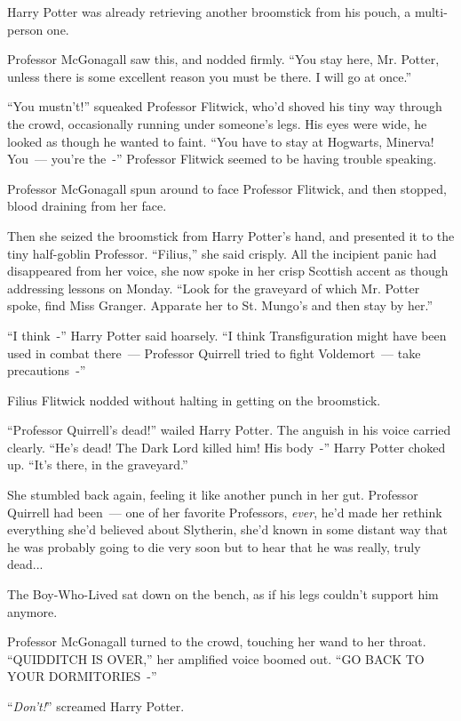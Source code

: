 Harry Potter was already retrieving another broomstick from his pouch, a multi-person one.

Professor McGonagall saw this, and nodded firmly. ``You stay here, Mr. Potter, unless there is some excellent reason you must be there. I will go at once.''

``You mustn't!'' squeaked Professor Flitwick, who'd shoved his tiny way through the crowd, occasionally running under someone's legs. His eyes were wide, he looked as though he wanted to faint. ``You have to stay at Hogwarts, Minerva! You~--- you're the~-'' Professor Flitwick seemed to be having trouble speaking.

Professor McGonagall spun around to face Professor Flitwick, and then stopped, blood draining from her face.

Then she seized the broomstick from Harry Potter's hand, and presented it to the tiny half-goblin Professor. ``Filius,'' she said crisply. All the incipient panic had disappeared from her voice, she now spoke in her crisp Scottish accent as though addressing lessons on Monday. ``Look for the graveyard of which Mr. Potter spoke, find Miss Granger. Apparate her to St. Mungo's and then stay by her.''

``I think~-'' Harry Potter said hoarsely. ``I think Transfiguration might have been used in combat there~--- Professor Quirrell tried to fight Voldemort~--- take precautions~-''

Filius Flitwick nodded without halting in getting on the broomstick.

``Professor Quirrell's dead!'' wailed Harry Potter. The anguish in his voice carried clearly. ``He's dead! The Dark Lord killed him! His body~-'' Harry Potter choked up. ``It's there, in the graveyard.''

She stumbled back again, feeling it like another punch in her gut. Professor Quirrell had been~--- one of her favorite Professors, \emph{ever}, he'd made her rethink everything she'd believed about Slytherin, she'd known in some distant way that he was probably going to die very soon but to hear that he was really, truly dead...

The Boy-Who-Lived sat down on the bench, as if his legs couldn't support him anymore.

Professor McGonagall turned to the crowd, touching her wand to her throat. ``QUIDDITCH IS OVER,'' her amplified voice boomed out. ``GO BACK TO YOUR DORMITORIES~-''

``\emph{Don't!}'' screamed Harry Potter.

